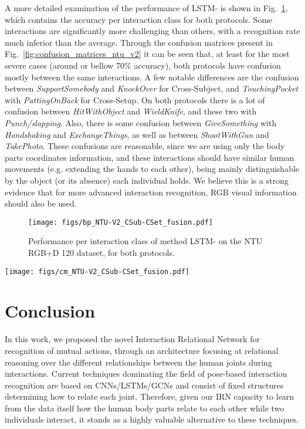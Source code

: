\documentclass[journal,twoside]{IEEEtran}
\begin{document}
A more detailed examination of the performance of LSTM- is shown in Fig.~\ref{fig:barplot_NTU-V2}, which contains the accuracy per interaction class for both protocols. Some interactions are significantly more challenging than others, with a recognition rate much inferior than the average.
Through the confusion matrices present in Fig.~\ref{fig:confusion_matrices_ntu_v2}
it can be seen that, at least for the most severe cases (around or bellow 70\% accuracy), both protocols have confusion mostly between the same interactions.
A few notable differences are the confusion between \emph{SupportSomebody} and \emph{KnockOver} for Cross-Subject, and \emph{TouchingPocket} with \emph{PattingOnBack} for Cross-Setup.
On both protocols there is a lot of confusion between \emph{HitWithObject} and \emph{WieldKnife}, and these two with \emph{Punch/slapping}.
Also, there is some confusion between \emph{GiveSomething} with \emph{Handshaking} and \emph{ExchangeThings}, as well as between \emph{ShootWithGun} and \emph{TakePhoto}.
These confusions are reasonable, since we are using only the body parts coordinates information, and these interactions should have similar human movements (e.g. extending the hands to each other), being mainly distinguishable by the object (or its absence) each individual holds.
We believe this is a strong evidence that for more advanced interaction recognition, RGB visual information should also be used.



\begin{figure}[t]
	\centering
	\texttt{[image: figs/bp\_NTU-V2\_CSub-CSet\_fusion.pdf]}
	\caption{Performance per interaction class of method LSTM- on the NTU RGB+D 120 dataset, for both protocols.}
	\label{fig:barplot_NTU-V2}
\end{figure}

\begin{figure*}[!t]
	\centering
	\texttt{[image: figs/cm\_NTU-V2\_CSub-CSet\_fusion.pdf]}
	\caption{Confusion matrices for NTU RGB+D 120 dataset with method LSTM- for protocols (a) Cross-Subject and (b) Cross-Setup.}
	\label{fig:confusion_matrices_ntu_v2}
\end{figure*}
 \section{Conclusion}
\label{sec:conclusion}

In this work, we proposed the novel Interaction Relational Network for recognition of mutual actions, through an architecture focusing at relational reasoning over the different relationships between the human joints during interactions.
Current techniques dominating the field of pose-based interaction recognition are based on CNNs/LSTMs/GCNs and consist of fixed structures determining how to relate each joint.
Therefore, given our IRN capacity to learn from the data itself how the human body parts relate to each other while two individuals interact, it stands as a highly valuable alternative to these techniques.
\end{document}
